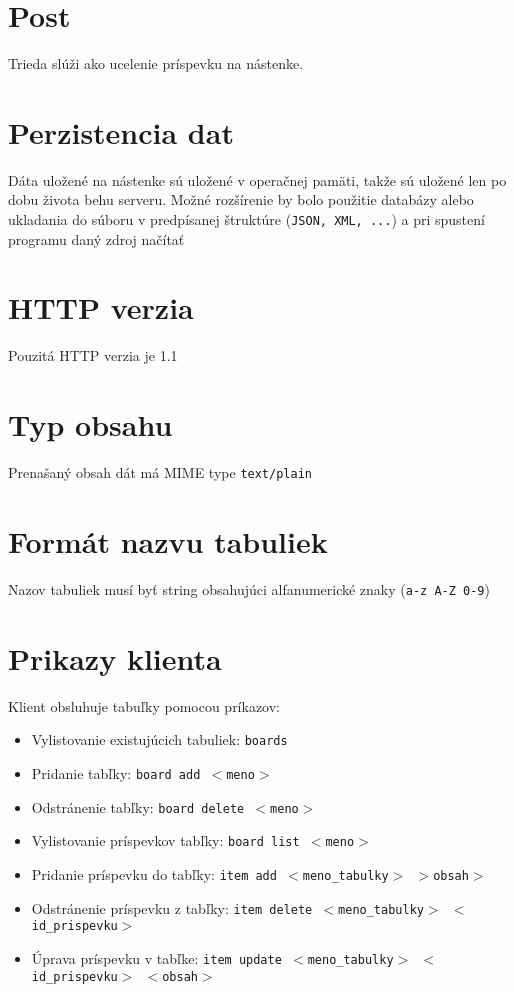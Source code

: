 \documentclass[a4paper,12pt,oneside]{article}
\theoremstyle{definition}
\theoremstyle{definition}
\theoremstyle{definition}
\begin{document}
\section{Post}
Trieda slúži ako ucelenie príspevku na nástenke.

\section{Perzistencia dat}
Dáta uložené na nástenke sú uložené v operačnej pamäti, takže sú uložené len po dobu života behu serveru. Možné rozšírenie by bolo použitie databázy alebo ukladania do súboru v predpísanej štruktúre (\texttt{JSON, XML, ...}) a pri spustení programu daný zdroj načítať

\section{HTTP verzia}
Pouzitá HTTP verzia je 1.1

\section{Typ obsahu}
Prenašaný obsah dát má MIME type \texttt{text/plain}

\section{Formát nazvu tabuliek}
Nazov tabuliek musí byť string obsahujúci alfanumerické znaky (\texttt{a-z A-Z 0-9})

\section{Prikazy klienta}
Klient obsluhuje tabuľky pomocou príkazov:
\begin{itemize}
	\item Vylistovanie existujúcich tabuliek: \texttt{boards}
	\item Pridanie tabľky: \texttt{board add $<$meno$>$}
	\item Odstránenie tabľky: \texttt{board delete $<$meno$>$}
	\item Vylistovanie príspevkov tabľky: \texttt{board list $<$meno$>$}
	\item Pridanie príspevku do tabľky: \texttt{item add $<$meno\_tabulky$>$ $>$obsah$>$}
	\item Odstránenie príspevku z tabľky: \texttt{item delete $<$meno\_tabulky$>$ $<$id\_prispevku$>$}
	\item Úprava príspevku v tabľke: \texttt{item update $<$meno\_tabulky$>$ $<$id\_prispevku$>$ $<$obsah$>$}
\end{itemize}
\end{document}
